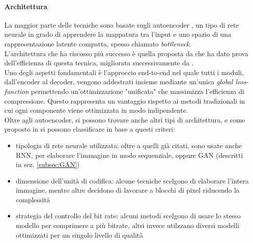 \paragraph{Architettura}La maggior parte delle tecniche sono basate sugli autoencoder \cite{theis2017lossy}, un tipo di rete neurale in grado di apprendere la mappatura tra l'input e uno spazio di una rappresentazione latente compatta, spesso chiamato \textit{bottleneck}.\\
L'architettura che ha riscosso più successo è quella proposta da \cite{balle2018variational} che ha dato prova dell'efficienza di questa tecnica, migliorata successivamente da \cite{minnen2018joint}.\\
Uno degli aspetti fondamentali è l'approccio end-to-end nel quale tutti i moduli, dall'encoder al decoder, vengono addestrati insieme mediante un'unica \textit{global loss-function} permettendo un'ottimizzazione "unificata" che massimizza l'efficienza di compressione. Questo rappresenta un vantaggio rispetto ai metodi tradizionali in cui ogni componente viene ottimizzata in modo indipendente.\\
Oltre agli autoencoder, si possono trovare anche altri tipi di architettura, e come proposto in \cite{ascenso2019report} si possono classificare in base a questi criteri:
\begin{itemize}
    \item tipologia di rete neurale utilizzata: oltre a quelli già citati, sono usate anche RNN, per elaborare l'immagine in modo sequenziale, oppure GAN (descritti in sez. \ref{subsec:GAN})
    \item dimensione dell'unità di codifica: alcune tecniche scelgono di elaborare l'intera immagine, mentre altre decidono di lavorare a blocchi di pixel riducendo la complessità
    \item strategia del controllo del bit rate: alcuni metodi scelgono di usare lo stesso modello per comprimere a più bitrate, altri invece utilzzano diversi modelli ottimizzati per un singolo livello di qualità
\end{itemize}
